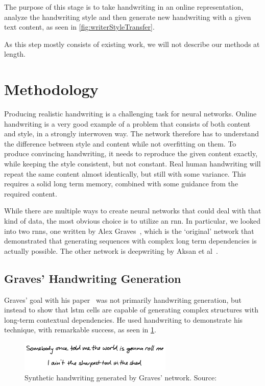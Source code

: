 The purpose of this stage is to take handwriting in an online representation, analyze the handwriting style and then generate new handwriting with a given text content, as seen in \cref{fig:writerStyleTransfer}.

As this step mostly consists of existing work, we will not describe our methods at length.

\section{Methodology}

Producing realistic handwriting is a challenging task for neural networks. Online handwriting is a very good example of a problem that consists of both content and style, in a strongly interwoven way. The network therefore has to understand the difference between style and content while not overfitting on them. To produce convincing handwriting, it needs to reproduce the given content exactly, while keeping the style consistent, but not constant. Real human handwriting will repeat the same content almost identically, but still with some variance. This requires a solid long term memory, combined with some guidance from the required content.

While there are multiple ways to create neural networks that could deal with that kind of data, the most obvious choice is to utilize an \gls{rnn}. In particular, we looked into two \glspl{rnn}, one written by Alex Graves~\cite{graves}, which is the `original' network that demonstrated that generating sequences with complex long term dependencies is actually possible. The other network is \gls{deepwriting} by Aksan et al~\cite{deepwriting}.

\subsection{Graves' Handwriting Generation}
Graves' goal with his paper~\cite{graves} was not primarily handwriting generation, but instead to show that \gls{lstm} cells are capable of generating complex structures with long-term contextual dependencies. He used handwriting to demonstrate his technique, with remarkable success, as seen in \cref{fig:gravesOutputDemo}.

\begin{figure}
  \centering
  \includegraphics[width=0.65\textwidth]{../assets/style_transfer/graves_output_demo.pdf}
  \caption[Synthetic handwriting generated by Graves' network]{Synthetic handwriting generated by Graves' network. Source:~\cite{gravesImplementation}}
  \label{fig:gravesOutputDemo}
\end{figure}

